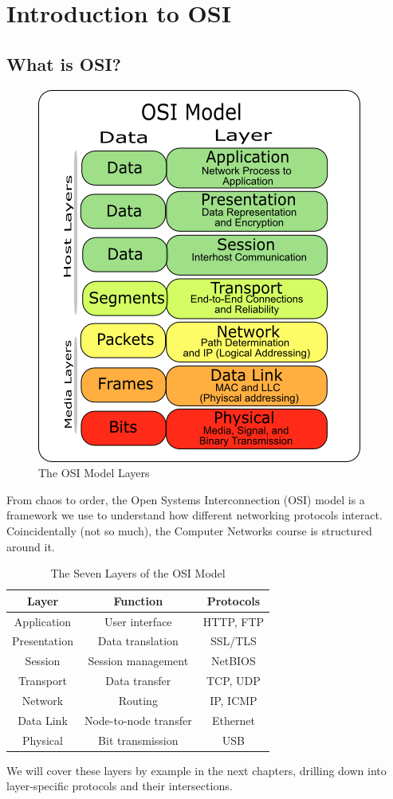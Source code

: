 \chapter{Introduction to OSI}\label{sec:osi_intro}
\section{What is OSI?}
\begin{figure}[h]
    \centering
    \includegraphics[width=.3\textwidth]{assets/osi/layers.png}
    \caption{The OSI Model Layers}\label{fig:osi_layers_intro}
\end{figure}
From chaos to order, the Open Systems Interconnection (OSI) model is a framework we use to understand how different networking protocols interact. Coincidentally (not so much), the Computer Networks course is structured around it.

\begin{table}[h]
    \centering
    \begin{tabular}{|c|c|c|}
        \hline
        \textbf{Layer} & \textbf{Function} & \textbf{Protocols} \\
        \hline
        Application & User interface & HTTP, FTP \\
        Presentation & Data translation & SSL/TLS \\
        Session & Session management & NetBIOS \\
        Transport & Data transfer & TCP, UDP \\
        Network & Routing & IP, ICMP \\
        Data Link & Node-to-node transfer & Ethernet \\
        Physical & Bit transmission & USB \\
        \hline
        \end{tabular}
    \caption{The Seven Layers of the OSI Model}\label{tab:osi_layers}
\end{table}

We will cover these layers by example in the next chapters, drilling down into layer-specific protocols and their intersections.
